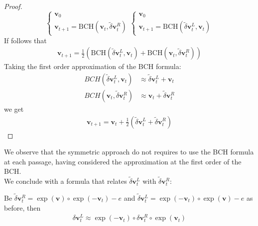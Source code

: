 \begin{proof}
\begin{equation}
	\begin{cases}
	\mathbf{v}_0  \\
	\mathbf{v}_{t+1} =\text{BCH}(\mathbf{v}_{t},\tilde{\delta} \mathbf{v}^{R}_{t})
	\end{cases}
	\begin{cases}
	\mathbf{v}_0  \\
	\mathbf{v}_{t+1} = \text{BCH}(\tilde{\delta} \mathbf{v}^{L}_{t}, \mathbf{v}_{t})
	\end{cases}
	\end{equation}
	If follows that
	\begin{align*}
	\mathbf{v}_{t+1} = \frac{1}{2}(\text{BCH}(\tilde{\delta} \mathbf{v}^{L}_{t}, \mathbf{v}_{t}) + \text{BCH}(\mathbf{v}_{t},\tilde{\delta} \mathbf{v}^{R}_{t}))
	\end{align*}
	Taking the first order approximation of the BCH formula:
	\begin{align}\label{eq:first_order_approx}
	BCH(\tilde{\delta} \mathbf{v}^{L}_{t}, \mathbf{v}_{t}) &\approx \tilde{\delta} \mathbf{v}^{L}_{t} + \mathbf{v}_{t}\\
	BCH(\mathbf{v}_{t},\tilde{\delta} \mathbf{v}^{R}_{t}) &\approx \mathbf{v}_{t} + \tilde{\delta} \mathbf{v}^{R}_{t}
	\end{align}
	we get
	\begin{align*}
	\mathbf{v}_{t+1} = \mathbf{v}_{t} + \frac{1}{2}(\tilde{\delta} \mathbf{v}^{L}_{t} + \tilde{\delta} \mathbf{v}^{R}_{t})
	\end{align*}
\end{proof}
We observe that the symmetric approach do not requires to use the BCH formula at each passage, having considered the approximation at the first order of the BCH.\\
We conclude with a formula that relates $\tilde{\delta} \mathbf{v}^{L}_{t}$ with $\tilde{\delta} \mathbf{v}^{R}_{t}$:
\begin{theorem}
	Be $\tilde{\delta} \mathbf{v}^{R}_{t} = \exp(\mathbf{v})\circ \exp(- \mathbf{v}_{t}) - e$ and $\tilde{\delta} \mathbf{v}^{L}_{t} = \exp(-\mathbf{v}_{t})\circ \exp(\mathbf{v}) - e$ as before, then
	\begin{align*}
	\delta \mathbf{v}^{L}_{t} \approx \exp(-\mathbf{v}_{t}) \circ \delta \mathbf{v}^{R}_{t} \circ \exp(\mathbf{v}_{t})
	\end{align*}
\end{theorem}

